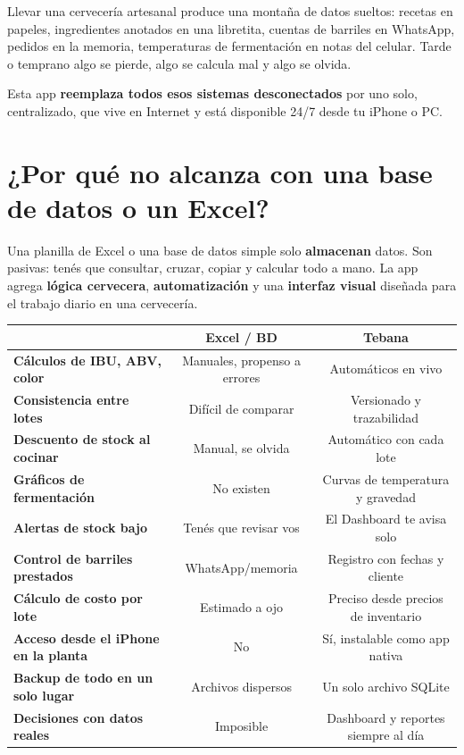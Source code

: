 \documentclass[11pt,a4paper]{report}
\begin{document}
Llevar una cervecería artesanal produce una montaña de datos sueltos: recetas en papeles, ingredientes anotados en una libretita, cuentas de barriles en WhatsApp, pedidos en la memoria, temperaturas de fermentación en notas del celular. Tarde o temprano algo se pierde, algo se calcula mal y algo se olvida.

Esta app \textbf{reemplaza todos esos sistemas desconectados} por uno solo, centralizado, que vive en Internet y está disponible 24/7 desde tu iPhone o PC.

\section{¿Por qué no alcanza con una base de datos o un Excel?}

Una planilla de Excel o una base de datos simple solo \textbf{almacenan} datos. Son pasivas: tenés que consultar, cruzar, copiar y calcular todo a mano. La app agrega \textbf{lógica cervecera}, \textbf{automatización} y una \textbf{interfaz visual} diseñada para el trabajo diario en una cervecería.

\begin{center}
\begin{tcolorbox}[colback=brown!5!white, colframe=beer!40, arc=6pt, title={Comparación: hoja de cálculo vs.\ Tebana}, fonttitle=\bfseries\small]
\small
\begin{tabular}{>{\bfseries}lcc}
\toprule
& \textbf{Excel / BD} & \textbf{Tebana} \\
\midrule
Cálculos de IBU, ABV, color            & Manuales, propenso a errores         & Automáticos en vivo \\
Consistencia entre lotes               & Difícil de comparar                   & Versionado y trazabilidad \\
Descuento de stock al cocinar          & Manual, se olvida                     & Automático con cada lote \\
Gráficos de fermentación               & No existen                            & Curvas de temperatura y gravedad \\
Alertas de stock bajo                  & Tenés que revisar vos                 & El Dashboard te avisa solo \\
Control de barriles prestados          & WhatsApp/memoria                      & Registro con fechas y cliente \\
Cálculo de costo por lote              & Estimado a ojo                        & Preciso desde precios de inventario \\
Acceso desde el iPhone en la planta    & No                                    & Sí, instalable como app nativa \\
Backup de todo en un solo lugar        & Archivos dispersos                    & Un solo archivo SQLite \\
Decisiones con datos reales            & Imposible                             & Dashboard y reportes siempre al día \\
\bottomrule
\end{tabular}
\end{tcolorbox}
\end{center}
\end{document}
